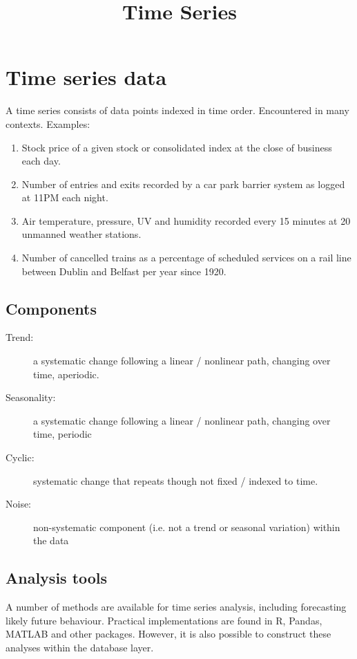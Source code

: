 \documentclass[slides]{pgnotes}
\title{Time Series}
\begin{document}
\maketitle

\section{Time series data}

A time series consists of data points indexed in time order.
Encountered in many contexts.
Examples: 

\begin{enumerate}
\item Stock price of a given stock or consolidated index at the close of business each day.
\item Number of entries and exits recorded by a car park barrier system as logged at 11PM each night.
\item Air temperature, pressure, UV and humidity recorded every 15 minutes at 20 unmanned weather stations. 
\item Number of cancelled trains as a percentage of scheduled services on a rail line between Dublin and Belfast per year since 1920. 
\end{enumerate}

\subsection{Components}

\begin{description}
\item[Trend:] a systematic change following a linear / nonlinear path, changing over time, aperiodic.
\item[Seasonality:] a systematic change following a linear / nonlinear path, changing over time, periodic
\item[Cyclic:] systematic change that repeats though not fixed / indexed to time. 
\item[Noise:] non-systematic component (i.e. not a trend or seasonal variation) within the data
\end{description}

\subsection{Analysis tools}

A number of methods are available for time series analysis, including forecasting likely future behaviour.
Practical implementations are found in R, Pandas, MATLAB and other packages.
However, it is also possible to construct these analyses within the database layer. 
\end{document}
